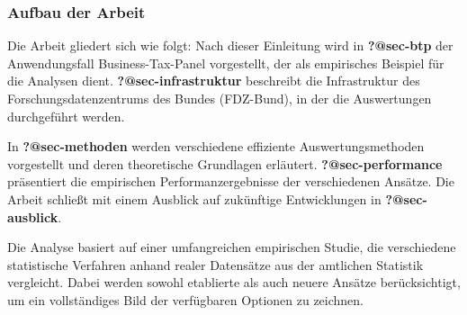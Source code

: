\documentclass[
  ngerman,
  10pt,
  twocolumn]{article}
\begin{document}
\subsubsection{Aufbau der Arbeit}\label{aufbau-der-arbeit}

Die Arbeit gliedert sich wie folgt: Nach dieser Einleitung wird in
\textbf{?@sec-btp} der Anwendungsfall Business-Tax-Panel vorgestellt,
der als empirisches Beispiel für die Analysen dient.
\textbf{?@sec-infrastruktur} beschreibt die Infrastruktur des
Forschungsdatenzentrums des Bundes (FDZ-Bund), in der die Auswertungen
durchgeführt werden.

In \textbf{?@sec-methoden} werden verschiedene effiziente
Auswertungsmethoden vorgestellt und deren theoretische Grundlagen
erläutert. \textbf{?@sec-performance} präsentiert die empirischen
Performanzergebnisse der verschiedenen Ansätze. Die Arbeit schließt mit
einem Ausblick auf zukünftige Entwicklungen in \textbf{?@sec-ausblick}.

Die Analyse basiert auf einer umfangreichen empirischen Studie, die
verschiedene statistische Verfahren anhand realer Datensätze aus der
amtlichen Statistik vergleicht. Dabei werden sowohl etablierte als auch
neuere Ansätze berücksichtigt, um ein vollständiges Bild der verfügbaren
Optionen zu zeichnen.


\printbibliography
\end{document}
